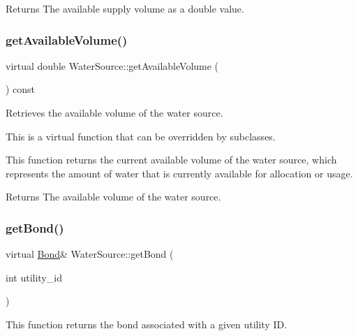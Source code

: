\begin{DoxyReturn}{Returns}
The available supply volume as a double value. 
\end{DoxyReturn}
\mbox{\label{classWaterSource_acb9e57253157c969fa57fc6e7b35ab68}} 
\subsubsection{\texorpdfstring{get\+Available\+Volume()}{getAvailableVolume()}}
{\footnotesize\ttfamily virtual double Water\+Source\+::get\+Available\+Volume (\begin{DoxyParamCaption}{ }\end{DoxyParamCaption}) const\hspace{0.3cm}{\ttfamily [virtual]}}



Retrieves the available volume of the water source. 

This is a virtual function that can be overridden by subclasses.

This function returns the current available volume of the water source, which represents the amount of water that is currently available for allocation or usage.

\begin{DoxyReturn}{Returns}
The available volume of the water source. 
\end{DoxyReturn}
\mbox{\label{classWaterSource_acacef71453819480c5438ae5b433e66b}} 
\subsubsection{\texorpdfstring{get\+Bond()}{getBond()}}
{\footnotesize\ttfamily virtual \mbox{\hyperlink{classBond}{Bond}}\& Water\+Source\+::get\+Bond (\begin{DoxyParamCaption}\item[{int}]{utility\+\_\+id }\end{DoxyParamCaption})\hspace{0.3cm}{\ttfamily [virtual]}}



This function returns the bond associated with a given utility ID. 

